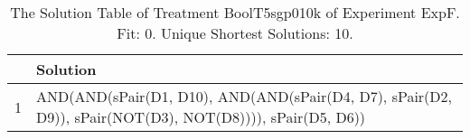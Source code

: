 \begin{table}[ht]
\centering
\begin{tabular}{rp{9cm}}
  \hline
 & Solution \\ 
  \hline
1 & AND(AND(sPair(D1, D10), AND(AND(sPair(D4, D7), sPair(D2, D9)), sPair(NOT(D3), NOT(D8)))), sPair(D5, D6)) \\ 
   \hline
\end{tabular}
\caption{The Solution Table of Treatment BoolT5sgp010k of Experiment ExpF. Fit: 0. Unique Shortest Solutions: 10.} 
\end{table}
